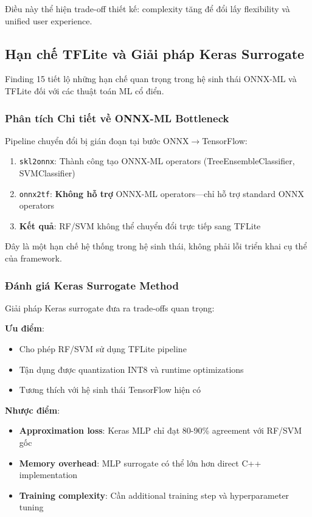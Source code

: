Điều này thể hiện trade-off thiết kế: complexity tăng để đổi lấy flexibility và unified user experience.

\subsection{Hạn chế TFLite và Giải pháp Keras Surrogate}
\label{sec:disc_tflite_limitations}

Finding 15 tiết lộ những hạn chế quan trọng trong hệ sinh thái ONNX-ML và TFLite đối với các thuật toán ML cổ điển.

\subsubsection{Phân tích Chi tiết về ONNX-ML Bottleneck}
Pipeline chuyển đổi bị gián đoạn tại bước ONNX$\rightarrow$TensorFlow:
\begin{enumerate}
    \item \texttt{skl2onnx}: Thành công tạo ONNX-ML operators (TreeEnsembleClassifier, SVMClassifier)
    \item \texttt{onnx2tf}: \textbf{Không hỗ trợ} ONNX-ML operators---chỉ hỗ trợ standard ONNX operators
    \item \textbf{Kết quả}: RF/SVM không thể chuyển đổi trực tiếp sang TFLite
\end{enumerate}

Đây là một hạn chế hệ thống trong hệ sinh thái, không phải lỗi triển khai cụ thể của framework.

\subsubsection{Đánh giá Keras Surrogate Method}
Giải pháp Keras surrogate đưa ra trade-offs quan trọng:

\textbf{Ưu điểm}:
\begin{itemize}
    \item Cho phép RF/SVM sử dụng TFLite pipeline
    \item Tận dụng được quantization INT8 và runtime optimizations
    \item Tương thích với hệ sinh thái TensorFlow hiện có
\end{itemize}

\textbf{Nhược điểm}:
\begin{itemize}
    \item \textbf{Approximation loss}: Keras MLP chỉ đạt 80-90\% agreement với RF/SVM gốc
    \item \textbf{Memory overhead}: MLP surrogate có thể lớn hơn direct C++ implementation
    \item \textbf{Training complexity}: Cần additional training step và hyperparameter tuning
\end{itemize}


